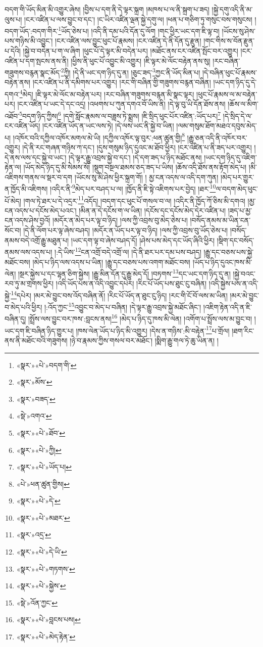 བདག་གི་ཡོད་མིན་མི་འགྱུར་ཞེས། །བྱིས་པ་དག་ནི་དེ་ལྟར་སྐྲག །མཁས་པ་ལ་ནི་སྐྲག་པ་ཟད། །སྐྱེ་དགུ་འདི་ནི་མ་ལུས་པ། །ངར་འཛིན་པ་ལས་བྱུང་བ་དང་། །ང་ཡིར་འཛིན་ལྡན་སྐྱེ་དགུ་ལ། །ཕན་པ་གཅིག་ཏུ་གསུང་བས་གསུངས། །བདག་ཡོད་:བདག་གིར་\footnote{«སྣར་»«པེ་»བདག་གི་}ཡོད་ཅེས་པ། །འདི་ནི་དམ་པའི་དོན་དུ་ལོག །གང་ཕྱིར་ཡང་དག་ཇི་ལྟ་བ། །ཡོངས་སུ་ཤེས་པས་གཉིས་མི་འབྱུང་། །ངར་འཛིན་ལས་བྱུང་ཕུང་པོ་རྣམས། །ངར་འཛིན་དེ་ནི་དོན་དུ་རྫུན། །གང་གིས་ས་བོན་རྫུན་པ་དེའི། །སྐྱེ་བ་བདེན་པ་ག་ལ་ཞིག །ཕུང་པོ་དེ་ལྟར་མི་བདེན་པར། །མཐོང་ནས་ངར་འཛིན་སྤོང་བར་འགྱུར། །ངར་འཛིན་པ་དག་སྤངས་ནས་ནི། །ཕྱིས་ནི་ཕུང་པོ་འབྱུང་མི་འགྱུར། །ཇི་ལྟར་མེ་ལོང་བརྟེན་ནས་སུ། །རང་བཞིན་གཟུགས་བརྙན་སྣང་མོད་\footnote{«སྣར་»མོས་}ཀྱི། །དེ་ནི་ཡང་དག་ཉིད་དུ་ན། །ཅུང་ཟད་\footnote{«སྣར་»བཟད་}ཀྱང་ནི་ཡོད་མིན་པ། །དེ་བཞིན་ཕུང་པོ་རྣམས་བརྟེན་ནས། །ངར་འཛིན་པ་ནི་དམིགས་པར་འགྱུར། །རང་གི་བཞིན་གྱི་གཟུགས་བརྙན་བཞིན། །ཡང་དག་ཉིད་དུ་དེ་དགའ་\footnote{«སྡེ་»འགའ་}མེད། །ཇི་ལྟར་མེ་ལོང་མ་བརྟེན་པར། །རང་བཞིན་གཟུགས་བརྙན་མི་སྣང་ལྟར། །ཕུང་པོ་རྣམས་ལ་མ་བརྟེན་པར། །ངར་འཛིན་པ་ཡང་དེ་དང་འདྲ། །འཕགས་པ་ཀུན་དགའ་བོ་ཡིས་ནི། །དེ་ལྟ་བུ་ཡི་དོན་ཐོས་ནས། །ཆོས་ལ་མིག་འཐོབ་\footnote{«སྣར་»«པེ་»ཐོབ་}བདག་ཉིད་ཀྱིས།\footnote{«སྣར་»«པེ་»ཀྱི།} །དགེ་སློང་རྣམས་ལ་བཟླས་ཏེ་སྨྲས། །ཇི་སྲིད་ཕུང་པོར་འཛིན་:ཡོད་པར།\footnote{«སྣར་»«པེ་»ཡོད་པ།} །དེ་སྲིད་དེ་ལ་ངར་འཛིན་ཡོད། །ངར་འཛིན་ཡོད་ན་ཡང་ལས་ཏེ། །དེ་ལས་ཡང་ནི་སྐྱེ་བ་ཡིན། །ལམ་གསུམ་ཐོག་མཐའ་དབུས་མེད་པ། །འཁོར་བའི་དཀྱིལ་འཁོར་མགལ་མེ་ཡི། །དཀྱིལ་འཁོར་ལྟ་བུར་:ཕན་ཚུན་གྱི།\footnote{«པེ་»ཕན་ཚུན་གྱིས།} །རྒྱུ་ཅན་འདི་ནི་འཁོར་བར་འགྱུར། །དེ་ནི་རང་གཞན་གཉིས་ཀ་དང་། །དུས་གསུམ་ཉིད་དུའང་མ་ཐོབ་ཕྱིར། །ངར་འཛིན་པ་ནི་ཟད་པར་འགྱུར། །དེ་ནས་ལས་དང་སྐྱེ་བ་ཡང་། །དེ་ལྟར་རྒྱུ་འབྲས་སྐྱེ་བ་དང་། །དེ་དག་ཟད་པ་ཉིད་མཐོང་ནས། །ཡང་དག་ཉིད་དུ་འཇིག་རྟེན་ལ། །ཡོད་མེད་ཉིད་དུ་མི་སེམས་སོ། །སྡུག་བསྔལ་ཐམས་ཅད་ཟད་པ་ཡིས། །ཆོས་འདི་ཐོས་ནས་རྟོག་མེད་པ། །མི་འཇིགས་གནས་ལ་སྡར་བ་དག །ཡོངས་སུ་མི་ཤེས་ཕྱིར་སྐྲག་གོ། །
མྱ་ངན་འདས་ལ་འདི་དག་ཀུན། །མེད་པར་གྱུར་ན་ཁྱོད་མི་འཇིགས། །འདིར་ནི་\footnote{«སྣར་»«པེ་»དེ་}མེད་པར་བཤད་པ་ལ། །ཁྱོད་ནི་ཇི་སྟེ་འཇིགས་པར་བྱེད། །ཐར་\footnote{«སྣར་»«པེ་»མཐར་}ལ་བདག་མེད་ཕུང་པོ་མེད། །གལ་ཏེ་ཐར་པ་དེ་འདྲར་\footnote{«སྣར་»འདྲ་}འདོད། །བདག་དང་ཕུང་པོ་གསལ་བ་ལ། །འདིར་ནི་ཁྱོད་ཀོ་ཅིས་མི་དགའ། །མྱ་ངན་འདས་པ་དངོས་མེད་པའང་། །མིན་ན་དེ་དངོས་ག་ལ་ཡིན། །དངོས་དང་དངོས་མེད་དེར་འཛིན་པ། །ཟད་པ་མྱ་ངན་འདས་ཤེས་བྱའོ། །མདོར་ན་མེད་པར་ལྟ་བ་ཉིད། །ལས་ཀྱི་འབྲས་བུ་མེད་ཅེས་པ། །བསོད་ནམས་མ་ཡིན་ངན་སོང་བ། །དེ་ནི་ལོག་པར་ལྟ་ཞེས་བཤད། །མདོར་ན་ཡོད་པར་ལྟ་བ་ཉིད། །ལས་ཀྱི་འབྲས་བུ་ཡོད་ཅེས་པ། །བསོད་ནམས་བདེ་འགྲོ་རྒྱུ་མཐུན་པ། །ཡང་དག་ལྟ་བ་ཞེས་བཤད་དོ། །ཤེས་པས་མེད་དང་ཡོད་ཞིའི་ཕྱིར། །སྡིག་དང་བསོད་ནམས་ལས་འདས་པ། །:དེ་ཡིས་\footnote{«སྣར་»«པེ་»དེ་ཡི་}ངན་འགྲོ་བདེ་འགྲོ་ལ། །དེ་ནི་ཐར་པར་དམ་པས་བཤད། །རྒྱུ་དང་བཅས་པས་སྐྱེ་མཐོང་བས། །མེད་པ་ཉིད་ལས་འདས་པ་ཡིན། །རྒྱུ་དང་བཅས་པས་འགག་མཐོང་བས། །ཡོད་པ་ཉིད་དུའང་ཁས་མི་ལེན། །སྔར་སྐྱེས་པ་དང་ལྷན་ཅིག་སྐྱེས། །རྒྱུ་མིན་དོན་དུ་རྒྱུ་མེད་དོ། །བཏགས་\footnote{«སྣར་»«པེ་»གཏགས་}དང་ཡང་དག་ཉིད་དུ་ན། །སྐྱེ་བའང་རབ་ཏུ་མ་གྲགས་ཕྱིར། །འདི་ཡོད་པས་ན་འདི་འབྱུང་དཔེར། །རིང་པོ་ཡོད་པས་ཐུང་ངུ་བཞིན། །འདི་སྐྱེས་པས་ན་འདི་སྐྱེ་\footnote{«སྣར་»«པེ་»སྐྱེས་}དཔེར། །མར་མེ་བྱུང་བས་འོད་བཞིན་ནོ། །རིང་པོ་ཡོད་ན་ཐུང་ངུ་ཉིད། །རང་གི་ངོ་བོ་ལས་མ་ཡིན། །མར་མེ་བྱུང་བ་མེད་པའི་ཕྱིར། །:འོད་ཀྱང་\footnote{«སྡེ་»འོན་ཀྱང་}འབྱུང་བ་མེད་པ་བཞིན། །དེ་ལྟར་རྒྱུ་འབྲས་སྐྱེ་མཐོང་ཞིང་། །འཇིག་རྟེན་འདི་ན་ཇི་བཞིན་དུ། །སྤྲོས་ལས་བྱུང་བར་ཁས་:བླངས་ནས།\footnote{«སྣར་»«པེ་»བླངས་པས།} །མེད་པ་ཉིད་དུ་ཁས་མི་ལེན། །འགོག་པ་སྤྲོས་ལས་མ་བྱུང་བ། །ཡང་དག་ཇི་བཞིན་ཉིད་གྱུར་པ། །ཁས་ལེན་ཡོད་པ་ཉིད་མི་འགྱུར། །དེས་ན་གཉིས་:མི་བརྟེན་\footnote{«སྣར་»«པེ་»མེད་རྟེན་}པ་གྲོལ། །ཐག་རིང་ནས་ནི་མཐོང་བའི་གཟུགས། །ཉེ་བ་རྣམས་ཀྱིས་གསལ་བར་མཐོང་། །སྨིག་རྒྱུ་གལ་ཏེ་ཆུ་ཡིན་ན། །
